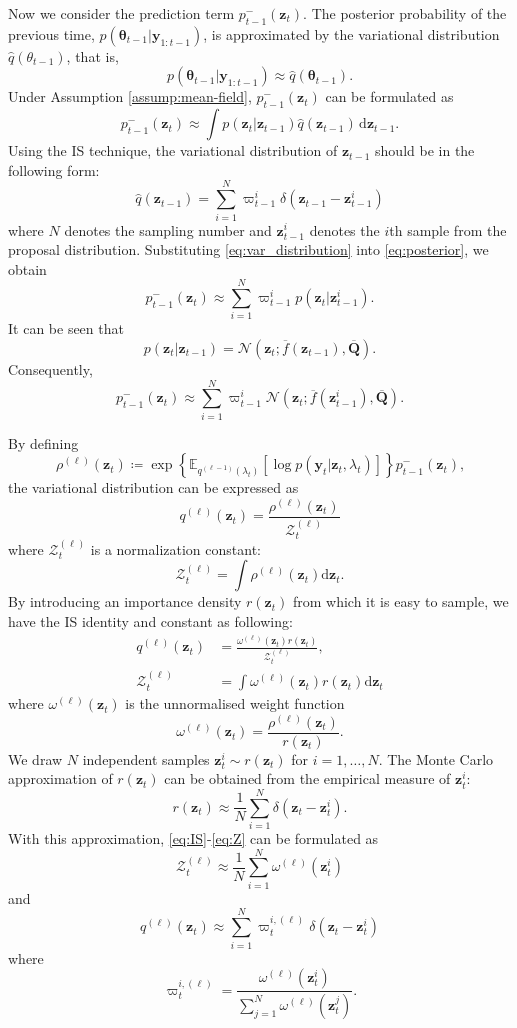 \documentclass[10pt,twocolumn,twoside]{IEEEtran}
\newcommand{\e}[1]{\exp\left\{#1\right\}}
\newcommand{\E}[2][]{ \mathbb{E}_{#1}\left[#2\right] } %
\newcommand{\cm}{\text{,}} %
\newcommand{\fs}{\text{.}} %
\newcommand{\y}{{ \bm{y} }}
\newcommand{\z}{{ \bm{z} }}
\begin{document}
\begin{appendices}
Now we consider the prediction term $p^-_{t-1}(\z_t)$. The posterior probability of the previous time, $p(\bm\theta_{t-1}|\y_{1:t-1})$, is approximated by the variational distribution $\hat{q}(\theta_{t-1})$, that is,
$$
p(\bm\theta_{t-1}|\y_{1:t-1}) \approx \hat{q}(\bm\theta_{t-1}) \fs
$$
Under Assumption \ref{assump:mean-field}, $p^-_{t-1}(\z_t)$ can be formulated as
$$
p^-_{t-1}(\z_t) \approx \int{p(\z_t|\z_{t-1})\hat{q}(\z_{t-1})}\,\mathrm{d}\z_{t-1} \fs
$$
Using the IS technique, the variational distribution of $\z_{t-1}$ should be in the following form:
\begin{equation} \label{eq:var_distribution}
    \hat{q}(\z_{t-1}) = \sum_{i=1}^N\varpi_{t-1}^i\delta(\z_{t-1}-\z_{t-1}^i)    
\end{equation}
where $N$ denotes the sampling number and $\z_{t-1}^i$ denotes the $i$th sample from the proposal distribution. Substituting \eqref{eq:var_distribution} into \eqref{eq:posterior}, we obtain
$$
p^-_{t-1}(\z_t) \approx \sum_{i=1}^N\varpi_{t-1}^ip(\z_t|\z_{t-1}^i) \fs
$$
It can be seen that
\begin{equation*}
    p(\z_t|\z_{t-1}) = \mathcal{N}(\z_t;\overline{f}(\z_{t-1}),\overline{\bm{Q}}) \fs
\end{equation*}
Consequently,
$$
p^-_{t-1}(\z_t) \approx \sum_{i=1}^N\varpi_{t-1}^i\mathcal{N}(\z_t;\overline{f}(\z_{t-1}^i),\overline{\bm{Q}}) \fs
$$

By defining
$$
\rho^{(\ell)}(\z_t) \coloneqq \e{\E[q^{(\ell-1)}(\lambda_t)]{\log{p(\y_t|\z_t,\lambda_t)}}}p^-_{t-1}(\z_t) \cm
$$
the variational distribution can be expressed as 
$$
q^{(\ell)}(\z_t) = \frac{\rho^{(\ell)}(\z_t)}{\mathcal{Z}^{(\ell)}_t}
$$
where $\mathcal{Z}^{(\ell)}_t$ is a normalization constant:
$$
\mathcal{Z}^{(\ell)}_t = \int{\rho^{(\ell)}(\z_t)}\mathrm{d}\z_t \fs
$$
By introducing an importance density $r(\z_t)$ from which it is easy to sample, we have the IS identity and constant as following:
\begin{align}
    q^{(\ell)}(\z_t) &= \frac{\omega^{(\ell)}(\z_t)r(\z_t)}{\mathcal{Z}^{(\ell)}_t}\cm \label{eq:IS}\\ 
    \mathcal{Z}^{(\ell)}_t &= \int{\omega^{(\ell)}(\z_t)}r(\z_t)\mathrm{d}\z_t \label{eq:Z}
\end{align}
where $\omega^{(\ell)}(\z_t)$ is the unnormalised weight function
$$
\omega^{(\ell)}(\z_t) = \frac{\rho^{(\ell)}(\z_t)}{r(\z_t)} \fs
$$
We draw $N$ independent samples $\z_t^i\sim r(\z_t)$ for $i=1,\dots,N$. The Monte Carlo approximation of $r(\z_t)$ can be obtained from the empirical measure of $\z_t^i$:
$$
r(\z_t) \approx \frac{1}{N}\sum_{i=1}^N\delta(\z_t-\z_t^i) \fs
$$
With this approximation, \eqref{eq:IS}-\eqref{eq:Z} can be formulated as
$$
\mathcal{Z}^{(\ell)}_t \approx \frac{1}{N}\sum_{i=1}^N\omega^{(\ell)}(\z_t^i)
$$
and
$$
q^{(\ell)}(\z_t) \approx \sum_{i=1}^N\varpi_t^{i,(\ell)}\delta(\z_t-\z_t^i)
$$
where
$$
\varpi_t^{i,(\ell)} = \frac{\omega^{(\ell)}(\z_t^i)}{\sum_{j=1}^N\omega^{(\ell)}(\z_t^j)} \fs
$$


\end{appendices}
\end{document}
